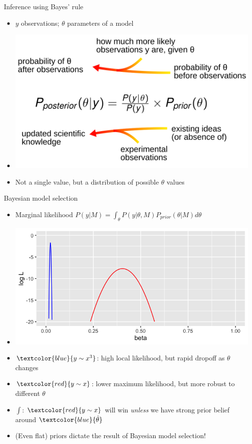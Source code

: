 \documentclass[10pt]{beamer}
\begin{document}
\begin{frame}{Inference using Bayes' rule}
  \begin{itemize}
  \item $y$ observations; $\theta$ parameters of a model
\item[] \includegraphics[width=.9\textwidth]{bayes-3.png}
    \item Not a single value, but a distribution of possible $\theta$ values
  \end{itemize}
\end{frame}

\begin{frame}{Bayesian model selection}
  \begin{itemize}
    \item Marginal likelihood $P(y|M) = \int_{\theta} P(y|\theta, M) P_{prior}(\theta|M) d\theta$
      \item[] \includegraphics[width=.8\textwidth]{cedas-bayes-peaks.png}
      \item $\textcolor{blue}{y \sim x^3}$: high local likelihood, but rapid dropoff as $\theta$ changes
      \item $\textcolor{red}{y \sim x}$: lower maximum likelihood, but more robust to different $\theta$
      \item $\int$: $\textcolor{red}{y \sim x}$ will win \emph{unless} we have strong prior belief around $\textcolor{blue}{\hat{\theta}}$
      \item (Even flat) priors dictate the result of Bayesian model selection!
  \end{itemize}
\end{frame}
\end{document}

